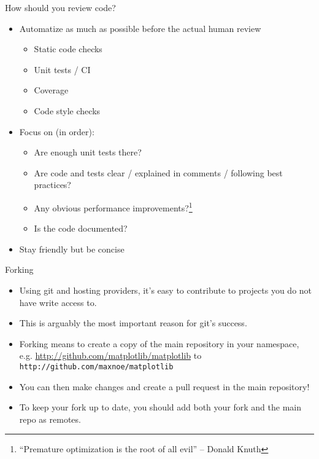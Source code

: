 \begin{frame}[c]{How should you review code?}
  \begin{itemize}
    \item Automatize as much as possible before the actual human review
      \begin{itemize}
        \item Static code checks
        \item Unit tests / CI
        \item Coverage
        \item Code style checks
      \end{itemize}
    \item Focus on (in order):
      \begin{itemize}
        \item[\color{positive}\faCheckSquare] Are enough unit tests there?
        \item[\color{positive}\faCheckSquare] Are code and tests clear / explained in comments / following best practices?
        \item[\color{positive}\faCheckSquare] Any obvious performance improvements?\footnote{\enquote{Premature optimization is the root of all evil} –  Donald Knuth}
        \item[\color{positive}\faCheckSquare] Is the code documented?
      \end{itemize}
    \item Stay friendly but be concise
  \end{itemize}
\end{frame}


\begin{frame}[c]{Forking}
  \begin{itemize}
    \item Using git and hosting providers, it's easy to contribute to projects you do not have write access to.

    \item This is arguably the most important reason for git's success.

    \item Forking means to create a copy of the main repository in your namespace, e.g. \url{http://github.com/matplotlib/matplotlib} to \texttt{http://github.com/maxnoe/matplotlib}

    \item You can then make changes and create a pull request in the main repository!

    \item To keep your fork up to date, you should add both your fork and the main repo as remotes.
  \end{itemize}
\end{frame}


